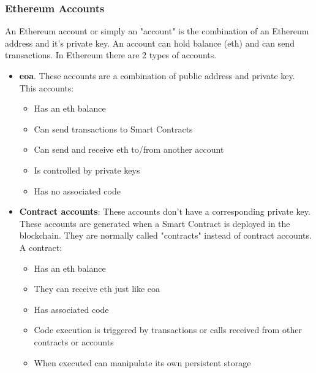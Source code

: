         \subsubsection{Ethereum Accounts}
            An Ethereum account or simply an "account" is the combination of an Ethereum address and it's private key. An account can hold balance (\acrlong{eth}) and can send transactions. In Ethereum there are 2 types of accounts.
            \begin{itemize}
                \item \textbf{\acrfull{eoa}}. These accounts are a combination of public address and private key. This accounts:
                \begin{itemize}
                    \item Has an \acrlong{eth} balance
                    \item Can send transactions to Smart Contracts
                    \item Can send and receive \acrlong{eth} to/from another account
                    \item Is controlled by private keys
                    \item Has no associated code
                \end{itemize}
                \item \textbf{Contract accounts}: These accounts don't have a corresponding private key. These accounts are generated when a Smart Contract is deployed in the blockchain. They are normally called "contracts" instead of contract accounts. A contract:
                \begin{itemize}
                    \item Has an \acrlong{eth} balance
                    \item They can receive \acrlong{eth} just like \acrshort{eoa}
                    \item Has associated code
                    \item Code execution is triggered by transactions or calls received from other contracts or accounts
                    \item When executed can manipulate its own persistent storage
                \end{itemize}
            \end{itemize}
        

